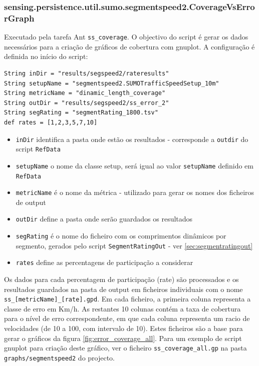 \documentclass{article}
\newcommand{\tm}[1]{\texttt{#1}}
\begin{document}
\subsubsection{sensing.persistence.util.sumo.segmentspeed2.CoverageVsErrorGraph}\label{sec:coverage}
Executado pela tarefa Ant \tm{ss\_coverage}. O objectivo do script é gerar os dados necessários para a criação de gráficos de cobertura com gnuplot.
A configuração é definida no início do script:

\begin{Verbatim}
String inDir = "results/segspeed2/rateresults"
String setupName = "segmentspeed2.SUMOTrafficSpeedSetup_10m"
String metricName = "dinamic_length_coverage"
String outDir = "results/segspeed2/ss_error_2"
String segRating = "segmentRating_1800.tsv" 
def rates = [1,2,3,5,7,10]
\end{Verbatim}

\begin{itemize}
\item \tm{inDir} identifica a pasta onde estão os resultados - corresponde a \tm{outdir} do script \tm{RefData}
\item \tm{setupName} o nome da classe setup, será igual ao valor \tm{setupName} definido em \tm{RefData}
\item \tm{metricName} é o nome da métrica - utilizado para gerar os nomes dos ficheiros de output
\item \tm{outDir} define a pasta onde serão guardados os resultados
\item \tm{segRating} é o nome do ficheiro com os comprimentos dinâmicos por segmento, gerados pelo script \tm{SegmentRatingOut} - ver \ref{sec:segmentratingout}
\item \tm{rates} define as percentagens de participação a considerar
\end{itemize}

Os dados para cada percentagem de participação (rate) são processados e os resultados guardados na pasta de output em ficheiros individuais com o nome \tm{ss\_[metricName]\_[rate].gpd}. Em cada ficheiro, a primeira coluna representa a classe de erro em Km/h. As restantes 10 colunas contém a taxa de cobertura para o nível de erro correspondente, em que cada coluna representa um racio de velocidades (de 10 a 100, com intervalo de 10). Estes ficheiros são a base para gerar o gráficos  da figura \ref{fig:error_coverage_all}. Para um exemplo de script gnuplot para criação deste gráfico, ver o ficheiro \tm{ss\_coverage\_all.gp} na pasta \tm{graphs/segmentspeed2} do projecto.
\end{document}
